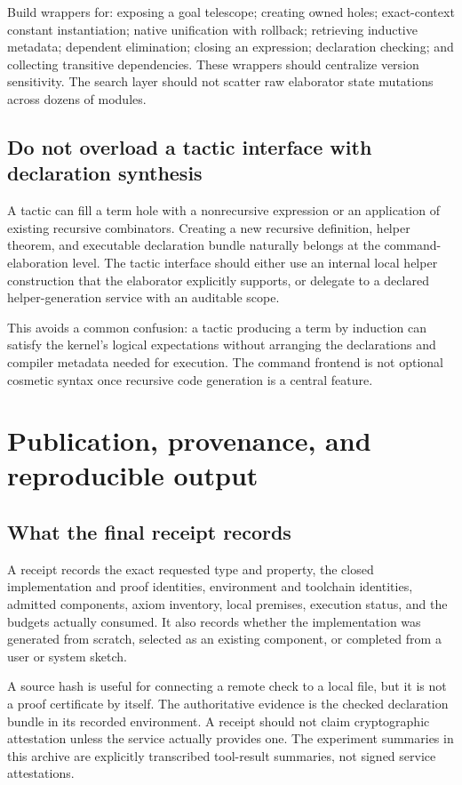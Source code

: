 Build wrappers for: exposing a goal telescope; creating owned holes; exact-context constant instantiation; native unification with rollback; retrieving inductive metadata; dependent elimination; closing an expression; declaration checking; and collecting transitive dependencies. These wrappers should centralize version sensitivity. The search layer should not scatter raw elaborator state mutations across dozens of modules.

\subsection{Do not overload a tactic interface with declaration synthesis}

A tactic can fill a term hole with a nonrecursive expression or an application of existing recursive combinators. Creating a new recursive definition, helper theorem, and executable declaration bundle naturally belongs at the command-elaboration level. The tactic interface should either use an internal local helper construction that the elaborator explicitly supports, or delegate to a declared helper-generation service with an auditable scope.

This avoids a common confusion: a tactic producing a term by induction can satisfy the kernel's logical expectations without arranging the declarations and compiler metadata needed for execution. The command frontend is not optional cosmetic syntax once recursive code generation is a central feature.

\section{Publication, provenance, and reproducible output}
\label{sec:publication}

\subsection{What the final receipt records}

A receipt records the exact requested type and property, the closed implementation and proof identities, environment and toolchain identities, admitted components, axiom inventory, local premises, execution status, and the budgets actually consumed. It also records whether the implementation was generated from scratch, selected as an existing component, or completed from a user or system sketch.

A source hash is useful for connecting a remote check to a local file, but it is not a proof certificate by itself. The authoritative evidence is the checked declaration bundle in its recorded environment. A receipt should not claim cryptographic attestation unless the service actually provides one. The experiment summaries in this archive are explicitly transcribed tool-result summaries, not signed service attestations.

